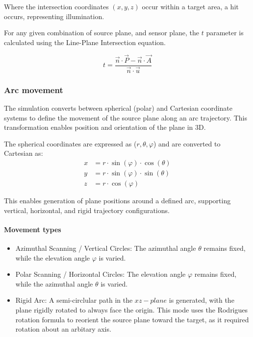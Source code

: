 Where the intersection coordinates $(x,y,z)$ occur within a target area, a hit occurs, representing illumination.

For any given combination of source plane, and sensor plane, the $t$ parameter is calculated using the Line-Plane Intersection equation.

\begin{equation}
    t = \frac{\vec{n} \cdot \vec{P} - \vec{n} \cdot \vec{A}}{\vec{n} \cdot \vec{u}}
    \label{eq:Line_Plane_Intersection}
\end{equation}

\subsubsection{Arc movement}
The simulation converts between spherical (polar) and Cartesian coordinate systems to define the movement of the source plane along an arc trajectory. This transformation enables position and orientation of the plane in 3D. 

The spherical coordinates are expressed as ($r, \theta, \varphi$) and are converted to Cartesian as:
\begin{align}
x &= r \cdot \sin(\varphi) \cdot \cos(\theta) \\
y &= r \cdot \sin(\varphi) \cdot \sin(\theta) \\
z &= r \cdot \cos(\varphi)
\end{align}

This enables generation of plane positions around a defined arc, supporting vertical, horizontal, and rigid trajectory configurations.

\paragraph{Movement types}
\begin{itemize}
    \item Azimuthal Scanning / Vertical Circles: The azimuthal angle $\theta$ remains fixed, while the elevation angle $\varphi$ is varied. 
    \item Polar Scanning / Horizontal Circles: The elevation angle $\varphi$ remains fixed, while the azimuthal angle $\theta$ is varied. 
    \item Rigid Arc: A semi-circlular path in the $xz-plane$ is generated, with the plane rigidly rotated to always face the origin. This mode uses the Rodrigues rotation formula to reorient the source plane toward the target, as it required rotation about an arbitary axis.  
\end{itemize}

